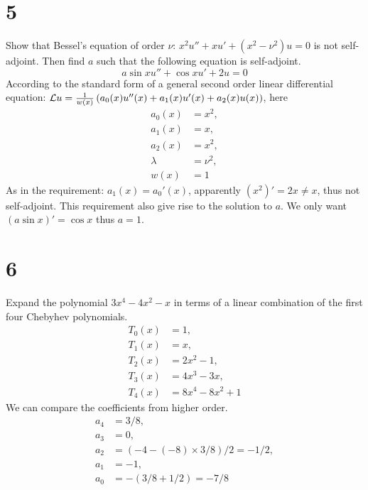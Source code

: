 \documentclass{article}
\begin{document}
\section*{5}
\begin{myleftlinebox}
    Show that Bessel's equation of order \(\nu\): \(x^2u''+xu'+(x^2-\nu^2)u=0\) is not self-adjoint. Then find \(a\) such that the following equation is self-adjoint.
    \[a\sin x u''+\cos x u'+2u=0\]
    \tcbline
    According to the standard form of a general second order linear differential equation: \(\mathcal{L} u =\frac{1}{w(x)}\left( a_0(x)u''(x)+a_1(x)u'(x)+a_2(x)u(x) \right)\), here
    \begin{align*}
        a_0(x) &= x^2,\\
        a_1(x) &= x,\\
        a_2(x) &= x^2,\\
        \lambda &= \nu^2,\\
        w(x) &= 1
    \end{align*}
    As in the requirement: \(a_1(x)=a_0'(x)\), apparently \((x^2)'=2x\neq x\), thus not self-adjoint. 
    This requirement also give rise to the solution to \(a\). We only want \((a\sin x)'=\cos x\) thus \(a=1\).

\end{myleftlinebox}

\section*{6}
\begin{myleftlinebox}
    Expand the polynomial \(3x^4-4x^2-x\) in terms of a linear combination of the first four Chebyhev polynomials.
    \tcbline
    \begin{align*}
        T_0(x) &= 1,\\
        T_1(x) &= x,\\
        T_2(x) &= 2x^2-1,\\
        T_3(x) &= 4x^3-3x,\\
        T_4(x) &= 8x^4-8x^2+1
    \end{align*}
    We can compare the coefficients from higher order.
    \begin{align*}
        a_4 &= 3/8,\\
        a_3 &= 0,\\
        a_2 &= (-4-(-8)\times 3/8)/2 = -1/2,\\
        a_1 &= -1,\\
        a_0 &= -(3/8+1/2)=-7/8
    \end{align*}
\end{myleftlinebox}
\end{document}
